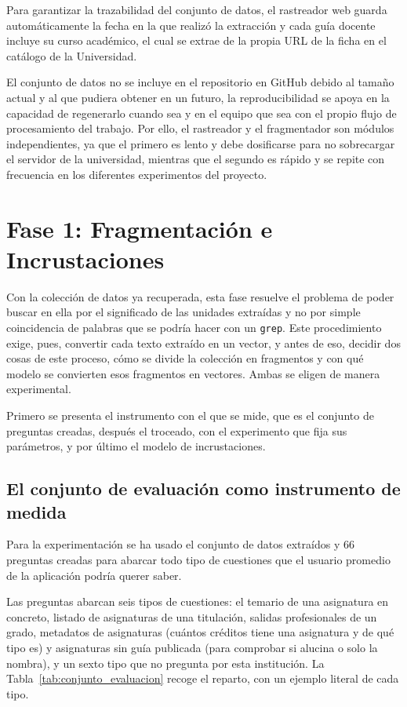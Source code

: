 Para garantizar la trazabilidad del conjunto de datos, el rastreador web guarda automáticamente la fecha en la que realizó la extracción y cada guía docente incluye su curso académico, el cual se extrae de la propia URL de la ficha en el catálogo de la Universidad. 

El conjunto de datos no se incluye en el repositorio en GitHub debido al tamaño actual y al que pudiera obtener en un futuro, la reproducibilidad se apoya en la capacidad de regenerarlo cuando sea y en el equipo que sea con el propio flujo de procesamiento del trabajo. Por ello, el rastreador y el fragmentador son módulos independientes, ya que el primero es lento y debe dosificarse para no sobrecargar el servidor de la universidad, mientras que el segundo es rápido y se repite con frecuencia en los diferentes experimentos del proyecto.


\section[Fase 1: Fragmentación e Incrustaciones]{Fase 1: Fragmentación e Incrustaciones}
\label{secc:fase1}

Con la colección de datos ya recuperada, esta fase resuelve el problema de poder buscar en ella por el significado de las unidades extraídas y no por simple coincidencia de palabras que se podría hacer con un \texttt{grep}. Este procedimiento exige, pues, convertir cada texto extraído en un vector, y antes de eso, decidir dos cosas de este proceso, cómo se divide la colección en fragmentos y con qué modelo se convierten esos fragmentos en vectores. Ambas se eligen de manera experimental.

Primero se presenta el instrumento con el que se mide, que es el conjunto de preguntas creadas, después el troceado, con el experimento que fija sus parámetros, y por último el modelo de incrustaciones.


\subsection[El conjunto de evaluación como instrumento de medida]{El conjunto de evaluación como instrumento de medida}
\label{secc:conjunto_evaluacion}

Para la experimentación se ha usado el conjunto de datos extraídos y 66 preguntas creadas para abarcar todo tipo de cuestiones que el usuario promedio de la aplicación podría querer saber.

Las preguntas abarcan seis tipos de cuestiones: el temario de una asignatura en concreto, listado de asignaturas de una
titulación, salidas profesionales de un grado, metadatos de asignaturas (cuántos créditos tiene una asignatura y de qué tipo es) y asignaturas sin guía publicada (para comprobar si alucina o solo la nombra), y un sexto tipo que no pregunta por esta institución. La Tabla~\ref{tab:conjunto_evaluacion} recoge el reparto, con un ejemplo literal de cada tipo.

